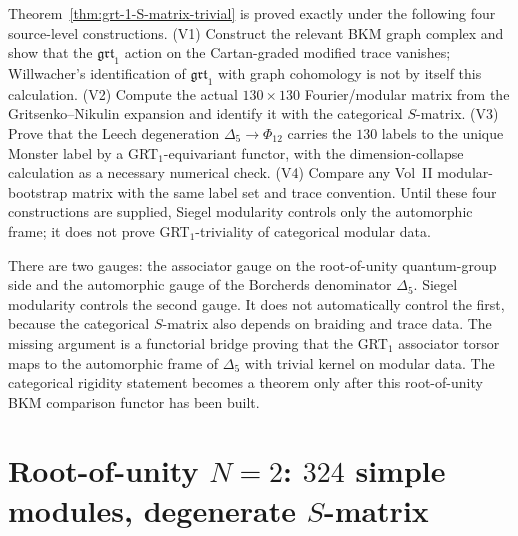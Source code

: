 \begin{remark}
\label{rem:as-grt-1-S-matrix-verif}
%
Theorem~\ref{thm:grt-1-S-matrix-trivial} is proved exactly under
the following four source-level constructions.
\textup{(V1)} Construct the relevant BKM graph complex and show that
the $\mathfrak{grt}_1$ action on the Cartan-graded modified trace
vanishes; Willwacher's identification of
$\mathfrak{grt}_1$ with graph cohomology is not by itself this
calculation.
\textup{(V2)} Compute the actual $130\times130$ Fourier/modular
matrix from the Gritsenko--Nikulin expansion and identify it with
the categorical $S$-matrix.
\textup{(V3)} Prove that the Leech degeneration
$\Delta_5\to\Phi_{12}$ carries the $130$ labels to the unique
Monster label by a GRT$_1$-equivariant functor, with the
dimension-collapse calculation as a necessary numerical check.
\textup{(V4)} Compare any Vol~II modular-bootstrap matrix with the
same label set and trace convention. Until these four constructions
are supplied, Siegel modularity controls only the automorphic frame;
it does not prove GRT$_1$-triviality of categorical modular data.
\end{remark}

\begin{remark}
\label{rem:as-grt-1-S-matrix-ghost}
%
There are two gauges: the associator gauge on the root-of-unity
quantum-group side and the automorphic gauge of the Borcherds
denominator $\Delta_5$. Siegel modularity controls the second gauge.
It does not automatically control the first, because the categorical
$S$-matrix also depends on braiding and trace data. The missing
argument is a functorial bridge proving that the GRT$_1$ associator
torsor maps to the automorphic frame of $\Delta_5$ with trivial
kernel on modular data. The categorical rigidity statement becomes a
theorem only after this root-of-unity BKM comparison functor has been
built.
\end{remark}

\section{Root-of-unity $N = 2$: $324$ simple modules, degenerate
$S$-matrix}
\label{sec:root-of-unity-N-2-vol-I-face}

